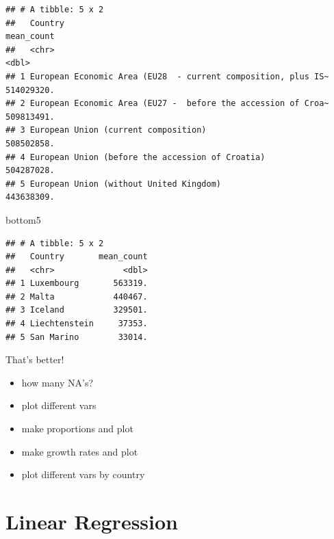 \documentclass[]{book}
\newenvironment{Shaded}{\begin{snugshade}}{\end{snugshade}}
\newcommand{\NormalTok}[1]{#1}
\providecommand{\tightlist}{%
  \setlength{\itemsep}{0pt}\setlength{\parskip}{0pt}}
\theoremstyle{definition}
\theoremstyle{definition}
\theoremstyle{definition}
\theoremstyle{remark}
\begin{document}
\begin{verbatim}
## # A tibble: 5 x 2
##   Country                                                       mean_count
##   <chr>                                                              <dbl>
## 1 European Economic Area (EU28  - current composition, plus IS~ 514029320.
## 2 European Economic Area (EU27 -  before the accession of Croa~ 509813491.
## 3 European Union (current composition)                          508502858.
## 4 European Union (before the accession of Croatia)              504287028.
## 5 European Union (without United Kingdom)                       443638309.
\end{verbatim}

\begin{Shaded}
\begin{Highlighting}[]
\NormalTok{bottom5}
\end{Highlighting}
\end{Shaded}

\begin{verbatim}
## # A tibble: 5 x 2
##   Country       mean_count
##   <chr>              <dbl>
## 1 Luxembourg       563319.
## 2 Malta            440467.
## 3 Iceland          329501.
## 4 Liechtenstein     37353.
## 5 San Marino        33014.
\end{verbatim}

That's better!

\begin{itemize}
\tightlist
\item
  how many NA's?
\item
  plot different vars
\item
  make proportions and plot
\item
  make growth rates and plot
\item
  plot different vars by country
\end{itemize}

\chapter{Linear Regression}\label{linreg}
\end{document}
